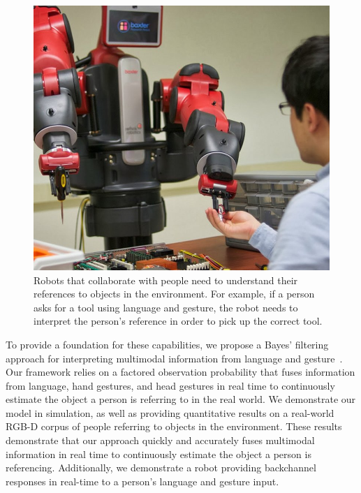 \documentclass[letterpaper, 10 pt, conference]{ieeeconf}
\begin{document}
\begin{figure}
\centering
\includegraphics[width=1\linewidth]{figures/baxter_scene_cropped.jpg}
\caption{Robots that collaborate with people need to understand their
  references to objects in the environment.  For example, if a person
  asks for a tool using language and gesture, the robot needs to
  interpret the person's reference in order to pick up the correct
  tool.\label{fig:example}}
\end{figure}



To provide a foundation for these capabilities, we propose a Bayes'
filtering approach for interpreting multimodal information from
language and gesture~\citep{thrun08}.  Our framework relies on a
factored observation probability that fuses information from language,
hand gestures, and head gestures in real time to continuously estimate
the object a person is referring to in the real world.  We demonstrate
our model in simulation, as well as providing quantitative results on
a real-world RGB-D corpus of people referring to objects in the
environment.  These results demonstrate that our approach quickly and
accurately fuses multimodal information in real time to continuously
estimate the object a person is referencing.  Additionally, we
demonstrate a robot providing backchannel responses in real-time to a
person's language and gesture input.
\end{document}
